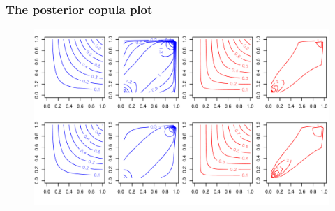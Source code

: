 \documentclass{beamer}
\begin{document}
\begin{frame}
  \frametitle{The posterior copula plot}
  \begin{figure}
    \centering
    \includegraphics[height=0.8\textheight]{contour}
  \end{figure}
\end{frame}
\end{document}
